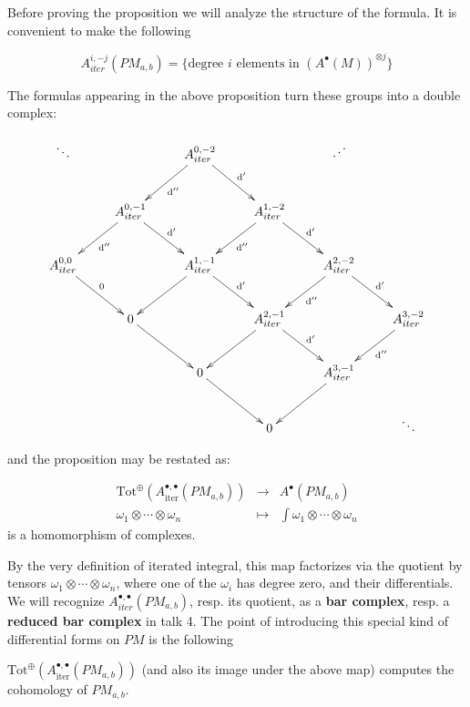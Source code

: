 Before proving the proposition we will analyze the structure of the formula. It is convenient to make
the following
\begin{defn}
\[
A^{i,-j}_{iter}(PM_{a,b}) = \{ \textrm{degree $i$ elements in $(A^{\bullet}(M))^{\otimes j}$} \}
\]
\end{defn}
The formulas appearing in the above proposition turn these groups into a double complex:

\[
\xymatrix{
\ddots & & A_{iter}^{0,-2} \ar[dl]^{{\mathrm{d}''}} \ar[dr]^{{\mathrm{d}'}} & & \iddots & \\ %
& A_{iter}^{0,-1}\ar[dl]^{{\mathrm{d}''}} \ar[dr]^{{\mathrm{d}'}}  & & A_{iter}^{1,-2} \ar[dl]^{{\mathrm{d}''}} \ar[dr]^{{\mathrm{d}'}} & \\
A_{iter}^{0, 0} \ar[dr]^0 & & A^{1,-1}_{iter} \ar[dl] \ar[dr]^{{\mathrm{d}'}} & & A_{iter}^{2,-2} \ar[dl]^{{\mathrm{d}''}} \ar[dr]^{{\mathrm{d}'}} \\
& 0 \ar[dr] & & A_{iter}^{2,-1} \ar[dl] \ar[dr]^{{\mathrm{d}'}} & & A_{iter}^{3,-2} \ar[dl]^{{\mathrm{d}''}} \\
& &  0 \ar[dr] & & A_{iter}^{3,-1} \ar[dl] & \\
& & & 0 & & \ddots
}
\]

and the proposition may be restated as:
\begin{cor}
\begin{eqnarray*}
\mathrm{Tot}^{\oplus}(A^{\bullet,\bullet}_{\textrm{iter}}(PM_{a,b})) &\to& A^{\bullet}(PM_{a,b}) \\
\omega_1 \otimes \cdots \otimes \omega_n &\mapsto& \int \omega_1 \otimes \cdots \otimes \omega_n
\end{eqnarray*}
is a homomorphism of complexes.
\end{cor}

By the very definition of iterated integral,
this map factorizes via the quotient by tensors $\omega_1 \otimes \cdots \otimes \omega_n$, where one of the $\omega_i$ has degree zero, and their differentials. We will recognize $A^{\bullet,\bullet}_{iter}(PM_{a,b})$, resp. its quotient, as a {\bf bar complex}, resp. a {\bf reduced bar complex} in talk 4. The point of introducing this special
kind of differential forms on $PM$ is the following

\begin{thm}[Chen]
$\mathrm{Tot}^{\oplus}(A^{\bullet,\bullet}_{\textrm{iter}}(PM_{a,b}))$ (and also its image under the above map) computes the cohomology of $PM_{a, b}$.
\end{thm}

